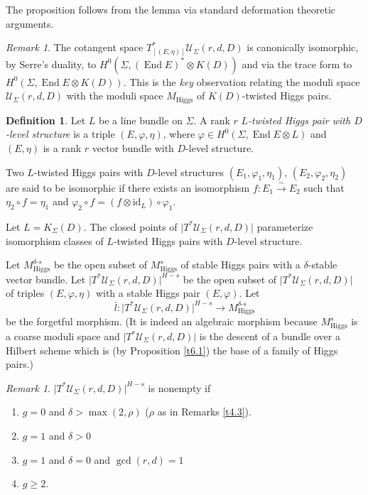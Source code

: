 \documentclass[12pt,a4paper,oneside,english]{smfart}
\theoremstyle{definition}
\newtheorem{defn}[thm]{Definition}
\theoremstyle{remark}
\newtheorem{rem}[thm]{Remark}
\DeclareMathOperator{\End}{End}
\newcommand{\Hig}{\mathrm{Higgs}}
\newcommand{\MH}{M_{\Hig}}
\newcommand{\MHs}{M^{s}_{\Hig}}
\newcommand{\MHds}{M^{\delta\text{-}s}_{\Hig}}
\newcommand{\cU}{\mathcal{U}}
\newcommand{\lbar}{\bar{l}}
\newcommand{\tot}[1]{\lvert #1 \rvert}
\begin{document}
The proposition follows from the lemma via standard deformation theoretic arguments.

\begin{rem}\label{t6.4}
The cotangent space $T^*_{[(E, \eta)]}\cU_\Sigma(r, d, D)$ is canonically isomorphic, by Serre's duality, to $H^0(\Sigma, (\End E)^* \otimes K(D))$ and via the trace form to $H^0(\Sigma, \End E \otimes K(D))$. This is the \emph{key} observation relating the moduli space $\cU_\Sigma(r, d, D)$ with the moduli space $\MH$ of $K(D)$-twisted Higgs pairs.
\end{rem}

\begin{defn}\label{t6.5}
Let $L$ be a line bundle on $\Sigma$. A rank $r$ \emph{$L$-twisted Higgs pair with $D$-level structure} is a triple $(E, \varphi, \eta)$, where $\varphi \in H^0(\Sigma, \End E \otimes L)$ and $(E, \eta)$ is a rank $r$ vector bundle with $D$-level structure.
\end{defn}

Two $L$-twisted Higgs pairs with $D$-level structures $(E_1, \varphi_1, \eta_1)$, $(E_2, \varphi_2, \eta_2)$ are said to be isomorphic if there exists an isomorphism $f \colon E_1 \xrightarrow{\sim} E_2$ such that $\eta_2 \circ f = \eta_1$ and $\varphi_2 \circ f = (f \otimes \mathrm{id}_L) \circ \varphi_1$.

Let $L = K_\Sigma(D)$. The closed points of $\tot{T^*\cU_\Sigma(r, d, D)}$ parameterize isomorphism classes of $L$-twisted Higgs pairs with $D$-level structure.

Let $\MHds$ be the open subset of $\MHs$ of stable Higgs pairs with a $\delta$-stable vector bundle. Let $\tot{T^*\cU_\Sigma(r, d, D)}^{H-s}$ be the open subset of $\tot{T^*\cU_\Sigma(r, d, D)}$ of triples $(E, \varphi, \eta)$ with a stable Higgs pair $(E, \varphi)$. Let
\[
\lbar \colon \tot{T^*\cU_\Sigma(r, d, D)}^{H-s} \to \MHds
\]
be the forgetful morphism. (It is indeed an algebraic morphism because $\MHs$ is a coarse moduli space and $\tot{T^*\cU_\Sigma(r, d, D)}$ is the descent of a bundle over a Hilbert scheme which is (by Proposition \ref{t6.1}) the base of a family of Higgs pairs.)

\begin{rem}\label{t6.6}
$\tot{T^*\cU_\Sigma(r, d, D)}^{H-s}$ is nonempty if
\begin{enumerate}
    \item $g = 0$ and $\delta > \max(2, \rho)$ ($\rho$ as in Remarks \ref{t4.3}).
    \item $g = 1$ and $\delta > 0$
    \item $g = 1$ and $\delta = 0$ and $\gcd(r, d) = 1$
    \item $g \geqslant 2$.
\end{enumerate}
\end{rem}
\end{document}
